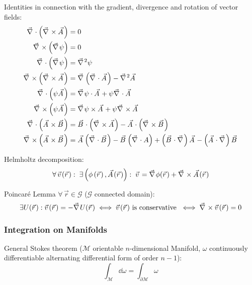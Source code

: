 			\noindent
			Identities in connection with the gradient, divergence and rotation of vector fields:
			\begin{equation}
				\begin{aligned}
					\Nabla\cdot\left(\Nabla\times\vec{A}\right) &= 0 \\
					\Nabla\times\left(\Nabla\psi\right) &= 0 \\
					\Nabla\cdot\left(\Nabla\psi\right) &= \Nabla^2\psi \\
					\Nabla\times\left(\Nabla\times\vec{A}\right) &= \Nabla\left(\Nabla\cdot\vec{A}\right) -\Nabla^2\vec{A} \\
					\Nabla\cdot\left(\psi\vec{A}\right) &= \Nabla\psi\cdot\vec{A} + \psi\Nabla\cdot\vec{A}\\
					\Nabla\times\left(\psi\vec{A}\right) &= \Nabla\psi\times\vec{A} + \psi\Nabla\times\vec{A} \\
					\Nabla\cdot\left(\vec{A}\times\vec{B}\right) &= \vec{B}\cdot\left(\Nabla\times\vec{A}\right) - 	\vec{A}\cdot\left(\Nabla\times\vec{B}\right) \\
					\Nabla\times\left(\vec{A}\times\vec{B}\right) &= \vec{A}\left(\Nabla\cdot\vec{B}\right) - \vec{B}\left(\Nabla\cdot{A}\right) + \left(\vec{B}\cdot\Nabla\right)\vec{A} - \left(\vec{A}\cdot\Nabla\right)\vec{B} \\
				\end{aligned}
			\end{equation}

			\noindent
			Helmholtz decomposition:
			\begin{equation}
				\forall \,\vec{v}(\vec{r}):\; \exists\left(\phi\left(\vec{r}\right),\vec{A}(\vec{r})\right):\;\vec{v} = \Nabla\phi(\vec{r}) + 	\Nabla\times\vec{A}(\vec{r})
			\end{equation}

			\noindent
			Poincaré Lemma $\forall\, \vec{r}\in\mathcal{G}$ ($\mathcal{G}$ connected domain):
			\begin{equation}
				\exists U(\vec{r}): \vec{v}(\vec{r}) = -\Nabla U(\vec{r})
				\iff \vec{v}(\vec{r}) \text{ is conservative }
				\iff \Nabla\times\vec{v}(\vec{r}) = 0
			\end{equation}

		\subsubsection{Integration on Manifolds}
			\noindent
			General Stokes theorem ($\mathcal{M}$ orientable $n$-dimensional Manifold, $\omega$ continuously differentiable alternating differential form of order $n-1$):
			\begin{equation}
				\int_\mathcal{M} \dd \omega = \int_{\partial\mathcal{M}} \omega
			\end{equation}


